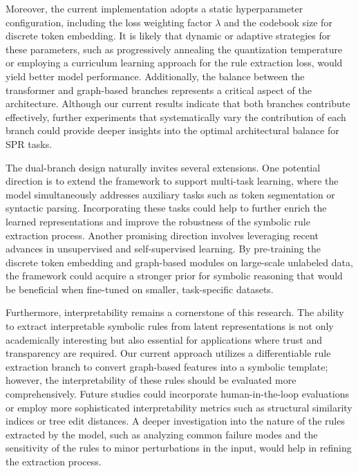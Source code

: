 \documentclass{article}
\begin{document}
Moreover, the current implementation adopts a static hyperparameter configuration, including the loss weighting factor \(\lambda\) and the codebook size for discrete token embedding. It is likely that dynamic or adaptive strategies for these parameters, such as progressively annealing the quantization temperature or employing a curriculum learning approach for the rule extraction loss, would yield better model performance. Additionally, the balance between the transformer and graph-based branches represents a critical aspect of the architecture. Although our current results indicate that both branches contribute effectively, further experiments that systematically vary the contribution of each branch could provide deeper insights into the optimal architectural balance for SPR tasks.

The dual-branch design naturally invites several extensions. One potential direction is to extend the framework to support multi-task learning, where the model simultaneously addresses auxiliary tasks such as token segmentation or syntactic parsing. Incorporating these tasks could help to further enrich the learned representations and improve the robustness of the symbolic rule extraction process. Another promising direction involves leveraging recent advances in unsupervised and self-supervised learning. By pre-training the discrete token embedding and graph-based modules on large-scale unlabeled data, the framework could acquire a stronger prior for symbolic reasoning that would be beneficial when fine-tuned on smaller, task-specific datasets.

Furthermore, interpretability remains a cornerstone of this research. The ability to extract interpretable symbolic rules from latent representations is not only academically interesting but also essential for applications where trust and transparency are required. Our current approach utilizes a differentiable rule extraction branch to convert graph-based features into a symbolic template; however, the interpretability of these rules should be evaluated more comprehensively. Future studies could incorporate human-in-the-loop evaluations or employ more sophisticated interpretability metrics such as structural similarity indices or tree edit distances. A deeper investigation into the nature of the rules extracted by the model, such as analyzing common failure modes and the sensitivity of the rules to minor perturbations in the input, would help in refining the extraction process.
\end{document}
